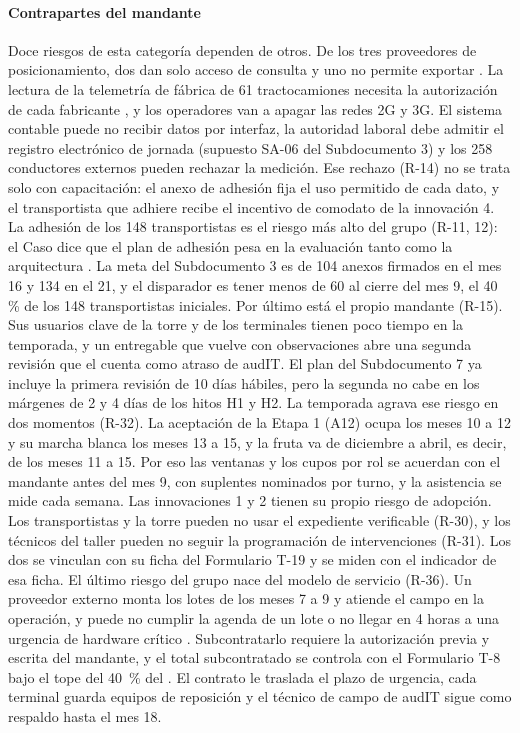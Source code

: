 \paragraph{Contrapartes del mandante}
Doce riesgos de esta categoría dependen de otros. De los tres proveedores de posicionamiento, dos dan solo acceso de
consulta y uno no permite exportar . La lectura de la telemetría de fábrica de
61 tractocamiones necesita la autorización de cada fabricante , y los operadores
van a apagar las redes 2G y 3G. El sistema contable puede no recibir datos por interfaz, la autoridad
laboral debe admitir el registro electrónico de jornada (supuesto SA-06 del Subdocumento 3) y los 258
conductores externos pueden rechazar la medición. Ese rechazo (R-14) no se trata solo con capacitación: el
anexo de adhesión fija el uso permitido de cada dato, y el transportista que adhiere recibe el
incentivo de comodato de la innovación 4. La adhesión de los 148 transportistas es el riesgo más
alto del grupo (R-11, 12): el Caso dice que el plan de adhesión pesa en la evaluación tanto como la arquitectura
. La meta del Subdocumento 3 es de 104 anexos firmados en el mes 16 y 134 en el
21, y el disparador es tener menos de 60 al cierre del mes 9, el 40 \% de los 148 transportistas iniciales. Por último
está el propio mandante (R-15). Sus usuarios clave de la torre y de los terminales tienen poco tiempo en
la temporada, y un entregable que vuelve con observaciones abre una segunda revisión que el
 cuenta como atraso de audIT. El plan del Subdocumento 7 ya incluye la primera revisión de
10 días hábiles, pero la segunda no cabe en los márgenes de 2 y 4 días de los hitos H1 y H2.
La temporada agrava ese riesgo en dos momentos (R-32). La aceptación de la Etapa 1 (A12) ocupa los meses
10 a 12 y su marcha blanca los meses 13 a 15, y la fruta va de diciembre a abril, es decir, de los meses
11 a 15. Por eso las ventanas y los cupos por rol se acuerdan con el mandante antes del mes 9, con
suplentes nominados por turno, y la asistencia se mide cada semana. Las innovaciones 1 y 2 tienen su
propio riesgo de adopción. Los transportistas y la torre pueden no usar el expediente verificable
(R-30), y los técnicos del taller pueden no seguir la programación de intervenciones (R-31). Los dos
se vinculan con su ficha del Formulario T-19 y se miden con el indicador de esa ficha. El último
riesgo del grupo nace del modelo de servicio (R-36). Un proveedor externo monta los lotes de los meses 7
a 9 y atiende el campo en la operación, y puede no cumplir la agenda de un lote o no llegar en 4 horas a
una urgencia de hardware crítico . Subcontratarlo requiere la autorización previa y
escrita del mandante, y el total subcontratado se controla con el Formulario T-8 bajo el tope del 40~\%
del . El contrato le traslada el plazo de urgencia, cada terminal guarda equipos de
reposición y el técnico de campo de audIT sigue como respaldo hasta el mes 18.

